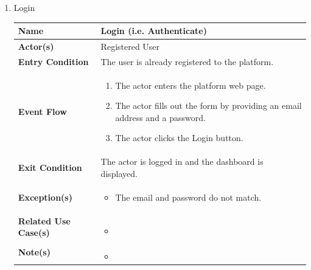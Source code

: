 \begin{enumerate}
    \item Login
    \begin{center}
    \begin{tabular}{ | m{10em} | m{10cm}| } 
      \hline
      \textbf{Name} & Login (i.e. Authenticate)  \\ 
      \hline
      \textbf{Actor(s)} & Registered User \\ 
      \hline
      \textbf{Entry Condition} & The user is already registered to the platform. \\ 
      \hline
      \textbf{Event Flow} & 
          \begin{enumerate}[(1)]
              \item The actor enters the platform web page.
              \item The actor fills out the form by providing an email address and a password.
              \item The actor clicks the Login button.
          \end{enumerate}
      \\ 
      \hline
      \textbf{Exit Condition} & The actor is logged in and the dashboard is displayed.  \\ 
      \hline
      \textbf{Exception(s)} & 
      \begin{itemize}
          \item The email and password do not match.
      \end{itemize}
      \\ 
      \hline
      \textbf{Related Use Case(s)} & 
      \begin{itemize}
          \item 
      \end{itemize}
      \\ 
      \hline
      \textbf{Note(s)} & 
      \begin{itemize}
          \item 
      \end{itemize}
      \\ 
      \hline
    \end{tabular}
\end{center}


\end{enumerate}
